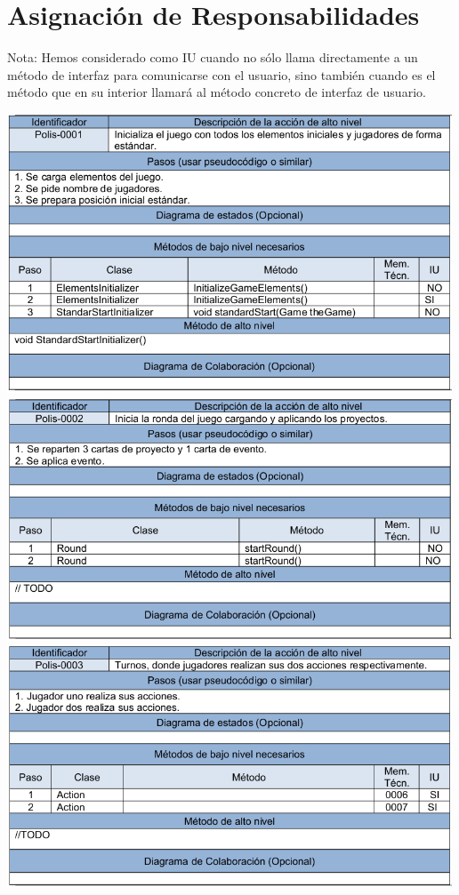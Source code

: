 \documentclass[11 pt]{book}
\begin{document}
\chapter{Asignación de Responsabilidades}
    Nota: Hemos considerado como IU cuando no sólo llama directamente a un método de interfaz para comunicarse con el usuario, sino también cuando es el método que en su interior llamará al método concreto de interfaz de usuario.

    \begin{center}
        \includegraphics[width=500px]{responsabilities-allocation/iteration3/polis-0001.png}
        \includegraphics[width=500px]{responsabilities-allocation/iteration3/polis-0002.png}
        \includegraphics[width=500px]{responsabilities-allocation/iteration3/polis-0003.png}

\end{center}
\end{document}
